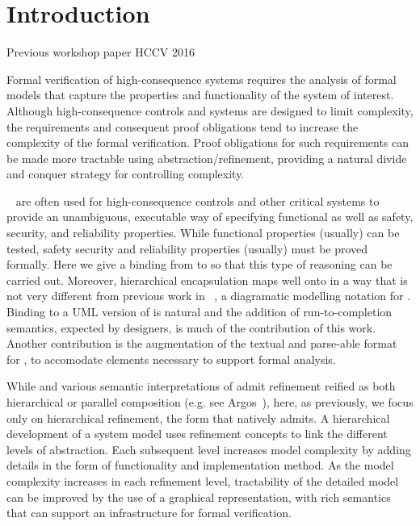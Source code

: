 
\section{Introduction}
\label{sec:introduction}

Previous workshop paper HCCV 2016~\cite{Morris_2016}

Formal verification of high-consequence systems requires the analysis
of formal models that capture the properties and functionality of the
system of interest. Although high-consequence controls and systems are
designed to limit complexity, the requirements and consequent proof
obligations tend to increase the complexity of the formal verification.  
Proof obligations for such requirements can be made more tractable using
abstraction/refinement, providing a natural divide and conquer
strategy for controlling complexity.

\Statecharts~\cite{Harel} are often used for high-consequence controls
and other critical systems to provide an unambiguous, executable way
of specifying functional as well as safety, security, and reliability
properties.  While functional properties (usually) can be tested,
safety security and reliability properties (usually) must be proved
formally.  Here we give a binding from \Statecharts to \EventB so that
this type of reasoning can be carried out.  Moreover, hierarchical
encapsulation maps well onto \Statecharts in a way that is not very
different from previous work in \iUMLB~\cite{Snook2006,snook14:_b_statem,Snook12:FMCO}, a diagramatic modelling notation for \EventB.
Binding \iUMLB to a UML version of \Statecharts is natural and the
addition of run-to-completion semantics, expected by \Statechart
designers, is much of the contribution of this work.  Another
contribution is the augmentation of the textual and parse-able format
for \Statecharts, \SCXML to accomodate elements necessary to support formal
analysis. 

While \Statecharts and various semantic interpretations of \Statecharts
admit refinement reified as both hierarchical or parallel composition
(e.g. see Argos~\cite{Maraninchi91theargos}), here, as
previously\cite{snook14:_b_statem}, we focus only on hierarchical
refinement, the form that \EventB natively admits.
  A hierarchical development of a system model uses refinement
concepts to link the different levels of abstraction. Each subsequent
level increases model complexity by adding details in the form of
functionality and implementation method. As the model complexity
increases in each refinement level, tractability of the detailed model
can be improved by the use of a graphical representation, with rich
semantics that can support an infrastructure for formal verification.

